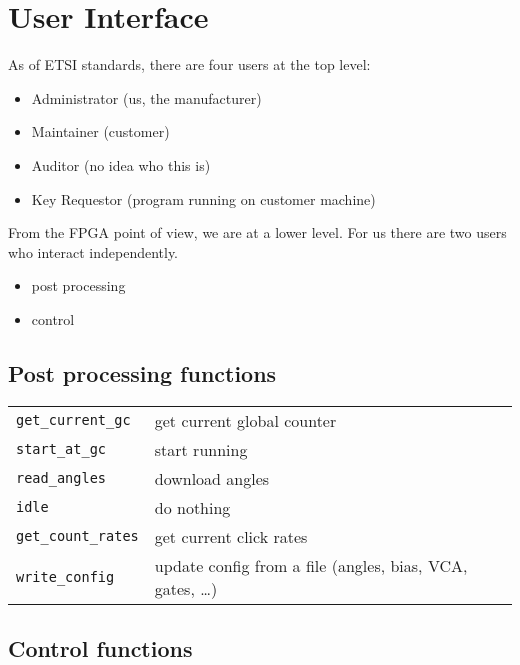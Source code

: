 \documentclass[10pt]{article}
\begin{document}
\section{User Interface}

As of ETSI standards, there are four users at the top level:
\begin{itemize}
    \item Administrator (us, the manufacturer)
    \item Maintainer (customer)
    \item Auditor (no idea who this is)
    \item Key Requestor (program running on customer machine)
\end{itemize}

From the FPGA point of view, we are at a lower level. For us there are two users who interact independently.
\begin{itemize}
    \item post processing
    \item control
\end{itemize}


\subsection{Post processing functions}

\begin{tabular}{l l}
    {\tt get\_current\_gc} & get current global counter \\
    {\tt start\_at\_gc} & start running  \\
    {\tt read\_angles} & download angles \\
    {\tt idle} & do nothing \\
    {\tt get\_count\_rates} & get current click rates \\
    {\tt write\_config} & update config from a file (angles, bias, VCA, gates, \dots) \\
\end{tabular}

\subsection{Control functions}
\end{document}
